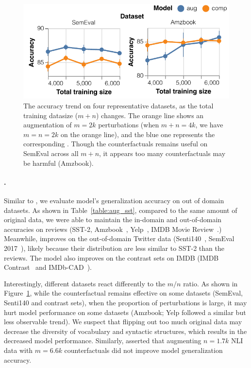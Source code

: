\begin{figure}[t]
\centering
\includegraphics[width=1\columnwidth]{figures/sst_trend_2}
\vspace{-15pt}
\caption{The accuracy trend on four representative datasets, as the total training datasize ($m+n$) changes. The orange line shows an augmentation of $m=2k$ perturbations (when $m+n=4k$, we have $m=n=2k$ on the orange line), and the blue one represents the corresponding \mcomp.
Though the counterfactuals remains useful on SemEval across all $m+n$, it appears too many counterfactuals may be harmful (Amzbook).
}
\vspace{-10pt}
\label{fig:sst_trend}
\end{figure}

\paragraph{\sst.}
Similar to \citet{kaushik2019learning}, we evaluate \sst model's generalization accuracy on out of domain datasets.
As shown in Table~\ref{table:aug_sst}, compared to the same amount of original data, we were able to maintain the in-domain and out-of-domain accuracies on reviews (SST-2, Amzbook~\cite{ni2019justifying}, Yelp~\cite{asghar2016yelp}, IMDB Movie Review~\cite{maas2011learning}.)
Meanwhile, \maug improves on the out-of-domain Twitter data (Senti140~\cite{go2009twitter}, SemEval 2017~\cite{rosenthal2017semeval}), likely because their distribution are less similar to SST-2 than the reviews.
The model also improves on the contrast sets on IMDB (IMDB Contrast~\cite{gardner2020contrast} and IMDb-CAD~\cite{kaushik2019learning}).

Interestingly, different datasets react differently to the $m/n$ ratio.
As shown in Figure~\ref{fig:sst_trend}, while the counterfactual remains effective on some datasets (\eg SemEval, Senti140 and contrast sets), when the proportion of perturbations is large, it may hurt model performance on some datasets (Amzbook; Yelp followed a similar but less observable trend).
We suspect that flipping out too much original data may decrease the diversity of vocabulary and syntactic structures, which results in the decreased model performance.
Similarly, \citet{huang2020counterfactually} asserted that augmenting $n=1.7k$ NLI data with $m=6.6k$ counterfactuals did not improve model generalization accuracy.

